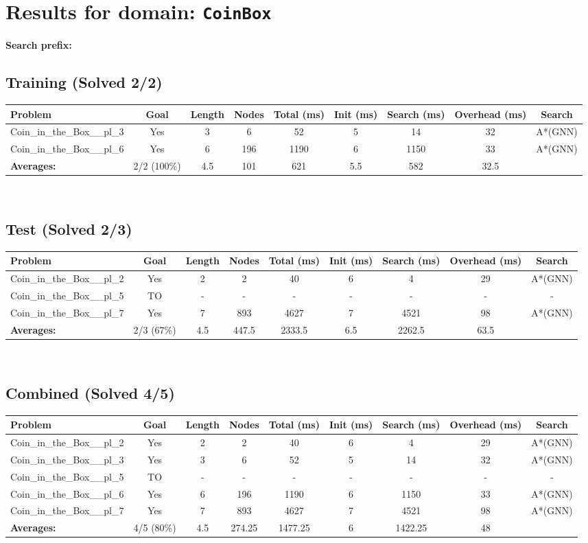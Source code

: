 \documentclass{article}
\begin{document}
\section*{Results for domain: \texttt{CoinBox}}
\textbf{Search prefix:} 
\\[0.5cm]
\subsection*{Training (Solved 2/2)}
\begin{tabular}{lcccccccc}
\toprule
Problem & Goal & Length & Nodes & Total (ms) & Init (ms) & Search (ms) & Overhead (ms) & Search \\
\midrule
Coin\_in\_the\_Box\_\_pl\_3 & Yes & 3 & 6 & 52 & 5 & 14 & 32 & A*(GNN) \\
Coin\_in\_the\_Box\_\_pl\_6 & Yes & 6 & 196 & 1190 & 6 & 1150 & 33 & A*(GNN) \\
\textbf{Averages:} & 2/2 (100\%) & 4.5 & 101 & 621 & 5.5 & 582 & 32.5 & \\
\bottomrule
\end{tabular}
\\[0.7cm]
\subsection*{Test (Solved 2/3)}
\begin{tabular}{lcccccccc}
\toprule
Problem & Goal & Length & Nodes & Total (ms) & Init (ms) & Search (ms) & Overhead (ms) & Search \\
\midrule
Coin\_in\_the\_Box\_\_pl\_2 & Yes & 2 & 2 & 40 & 6 & 4 & 29 & A*(GNN) \\
Coin\_in\_the\_Box\_\_pl\_5 & TO & - & - & - & - & - & - & - \\
Coin\_in\_the\_Box\_\_pl\_7 & Yes & 7 & 893 & 4627 & 7 & 4521 & 98 & A*(GNN) \\
\textbf{Averages:} & 2/3 (67\%) & 4.5 & 447.5 & 2333.5 & 6.5 & 2262.5 & 63.5 & \\
\bottomrule
\end{tabular}
\\[0.7cm]
\subsection*{Combined (Solved 4/5)}
\begin{tabular}{lcccccccc}
\toprule
Problem & Goal & Length & Nodes & Total (ms) & Init (ms) & Search (ms) & Overhead (ms) & Search \\
\midrule
Coin\_in\_the\_Box\_\_pl\_2 & Yes & 2 & 2 & 40 & 6 & 4 & 29 & A*(GNN) \\
Coin\_in\_the\_Box\_\_pl\_3 & Yes & 3 & 6 & 52 & 5 & 14 & 32 & A*(GNN) \\
Coin\_in\_the\_Box\_\_pl\_5 & TO & - & - & - & - & - & - & - \\
Coin\_in\_the\_Box\_\_pl\_6 & Yes & 6 & 196 & 1190 & 6 & 1150 & 33 & A*(GNN) \\
Coin\_in\_the\_Box\_\_pl\_7 & Yes & 7 & 893 & 4627 & 7 & 4521 & 98 & A*(GNN) \\
\textbf{Averages:} & 4/5 (80\%) & 4.5 & 274.25 & 1477.25 & 6 & 1422.25 & 48 & \\
\bottomrule
\end{tabular}
\\[0.7cm]
\end{document}
